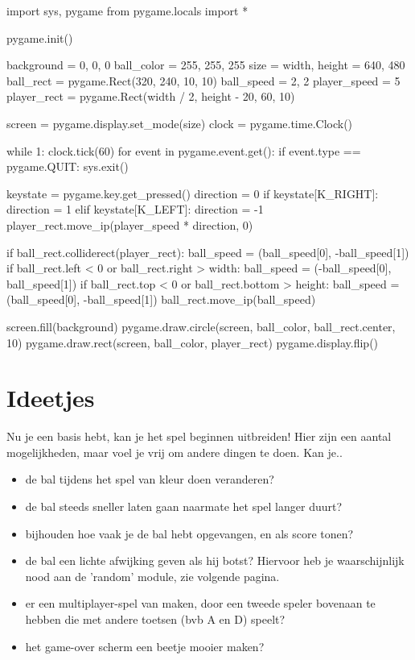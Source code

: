 \documentclass[10pt,a4paper]{article}
\begin{document}
\begin{python}
import sys, pygame
from pygame.locals import *

pygame.init()

background = 0, 0, 0
ball_color = 255, 255, 255
size = width, height = 640, 480
ball_rect = pygame.Rect(320, 240, 10, 10)
ball_speed = 2, 2
player_speed = 5
player_rect = pygame.Rect(width / 2, height - 20, 60, 10)

screen = pygame.display.set_mode(size)
clock = pygame.time.Clock()

while 1:
    clock.tick(60)
    for event in pygame.event.get():
        if event.type == pygame.QUIT: sys.exit()
    
    keystate = pygame.key.get_pressed()
    direction = 0
    if keystate[K_RIGHT]:
        direction = 1
    elif keystate[K_LEFT]:
        direction = -1
    player_rect.move_ip(player_speed * direction, 0)

    if ball_rect.colliderect(player_rect):
        ball_speed = (ball_speed[0], -ball_speed[1])
    if ball_rect.left < 0 or ball_rect.right > width:
        ball_speed = (-ball_speed[0], ball_speed[1])
    if ball_rect.top < 0 or ball_rect.bottom > height:
        ball_speed = (ball_speed[0], -ball_speed[1])
    ball_rect.move_ip(ball_speed)
    
    screen.fill(background)
    pygame.draw.circle(screen, ball_color, ball_rect.center, 10)
    pygame.draw.rect(screen, ball_color, player_rect)
    pygame.display.flip()
\end{python}

\section{Ideetjes}
Nu je een basis hebt, kan je het spel beginnen uitbreiden! Hier zijn een aantal mogelijkheden, maar voel je vrij om andere dingen te doen. Kan je..

\begin{itemize}
\item de bal tijdens het spel van kleur doen veranderen?
\item de bal steeds sneller laten gaan naarmate het spel langer duurt?
\item bijhouden hoe vaak je de bal hebt opgevangen, en als score tonen?
\item de bal een lichte afwijking geven als hij botst? Hiervoor heb je waarschijnlijk nood aan de 'random' module, zie volgende pagina.
\item er een multiplayer-spel van maken, door een tweede speler bovenaan te hebben die met andere toetsen (bvb A en D) speelt?
\item het game-over scherm een beetje mooier maken?
\end{itemize}
\end{document}
